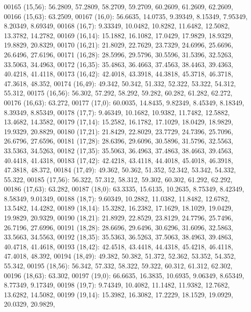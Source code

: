 \begin{DoxyCode}
00165       (15,56): 56.2809, 57.2809, 58.2709, 59.2709, 60.2609, 61.2609, 62.2609,
00166       (15,63): 63.2509,
00167       (16,0): 56.6635, 14.0735, 9.39349, 8.15349, 7.95349, 8.20349, 8.69349,
00168       (16,7): 9.33349, 10.0482, 10.8282, 11.6482, 12.5082, 13.3782, 14.2782,
00169       (16,14): 15.1882, 16.1082, 17.0429, 17.9829, 18.9329, 19.8829, 20.8329,
00170       (16,21): 21.8029, 22.7629, 23.7329, 24.6996, 25.6696, 26.6496, 27.6196,
00171       (16,28): 28.5996, 29.5796, 30.5596, 31.5396, 32.5263, 33.5063, 34.4963,
00172       (16,35): 35.4863, 36.4663, 37.4563, 38.4463, 39.4363, 40.4218, 41.4118,
00173       (16,42): 42.4018, 43.3918, 44.3818, 45.3718, 46.3718, 47.3618, 48.352,
00174       (16,49): 49.342, 50.342, 51.332, 52.322, 53.322, 54.312, 55.312,
00175       (16,56): 56.302, 57.292, 58.292, 59.282, 60.282, 61.282, 62.272,
00176       (16,63): 63.272,
00177       (17,0): 60.0035, 14.8435, 9.82349, 8.45349, 8.18349, 8.39349, 8.85349,
00178       (17,7): 9.46349, 10.1682, 10.9382, 11.7482, 12.5882, 13.4682, 14.3582,
00179       (17,14): 15.2582, 16.1782, 17.1029, 18.0429, 18.9829, 19.9329, 20.8829,
00180       (17,21): 21.8429, 22.8029, 23.7729, 24.7396, 25.7096, 26.6796, 27.6596,
00181       (17,28): 28.6396, 29.6096, 30.5896, 31.5796, 32.5563, 33.5363, 34.5263,
00182       (17,35): 35.5063, 36.4963, 37.4863, 38.4663, 39.4563, 40.4418, 41.4318,
00183       (17,42): 42.4218, 43.4118, 44.4018, 45.4018, 46.3918, 47.3818, 48.372,
00184       (17,49): 49.362, 50.362, 51.352, 52.342, 53.342, 54.332, 55.322,
00185       (17,56): 56.322, 57.312, 58.312, 59.302, 60.302, 61.292, 62.292,
00186       (17,63): 63.282,
00187       (18,0): 63.3335, 15.6135, 10.2635, 8.75349, 8.42349, 8.58349, 9.01349,
00188       (18,7): 9.60349, 10.2882, 11.0382, 11.8482, 12.6782, 13.5482, 14.4282,
00189       (18,14): 15.3282, 16.2382, 17.1629, 18.1029, 19.0429, 19.9829, 20.9329,
00190       (18,21): 21.8929, 22.8529, 23.8129, 24.7796, 25.7496, 26.7196, 27.6996,
00191       (18,28): 28.6696, 29.6496, 30.6296, 31.6096, 32.5863, 33.5663, 34.5563,
00192       (18,35): 35.5363, 36.5263, 37.5063, 38.4963, 39.4863, 40.4718, 41.4618,
00193       (18,42): 42.4518, 43.4418, 44.4318, 45.4218, 46.4118, 47.4018, 48.392,
00194       (18,49): 49.382, 50.382, 51.372, 52.362, 53.352, 54.352, 55.342,
00195       (18,56): 56.342, 57.332, 58.322, 59.322, 60.312, 61.312, 62.302,
00196       (18,63): 63.302,
00197       (19,0): 66.6635, 16.3835, 10.6935, 9.06349, 8.65349, 8.77349, 9.17349,
00198       (19,7): 9.74349, 10.4082, 11.1482, 11.9382, 12.7682, 13.6282, 14.5082,
00199       (19,14): 15.3982, 16.3082, 17.2229, 18.1529, 19.0929, 20.0329, 20.9829,

\end{DoxyCode}
